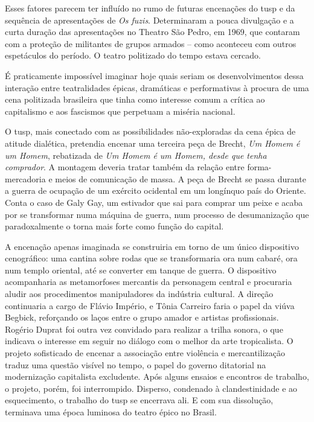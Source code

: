 Esses fatores parecem ter influído no rumo de futuras encenações do {\sc tusp}
e da sequência de apresentações de {\it Os fuzis}. Determinaram a pouca
divulgação e a curta duração das apresentações no Theatro São Pedro, em
1969, que contaram com a proteção de militantes de grupos armados -- como
aconteceu com outros espetáculos do período. O teatro politizado do
tempo estava cercado.

É praticamente impossível imaginar hoje quais seriam os desenvolvimentos
dessa interação entre teatralidades épicas, dramáticas e performativas à
procura de uma cena politizada brasileira que tinha como interesse comum
a crítica ao capitalismo e aos fascismos que perpetuam a miséria
nacional.

O {\sc tusp}, mais conectado com as possibilidades não-exploradas da cena
épica de atitude dialética, pretendia encenar uma terceira peça de
Brecht, {\it Um Homem é um Homem}, rebatizada de {\it Um Homem é um
Homem, desde que tenha comprador}. A montagem deveria tratar também da
relação entre forma-mercadoria e meios de comunicação de massa. A peça
de Brecht se passa durante a guerra de ocupação de um exército ocidental
em um longínquo país do Oriente. Conta o caso de Galy Gay, um estivador
que sai para comprar um peixe e acaba por se transformar numa máquina de
guerra, num processo de desumanização que paradoxalmente o torna mais
forte como função do capital.

A encenação apenas imaginada se construiria em torno de um único
dispositivo cenográfico: uma cantina sobre rodas que se transformaria
ora num cabaré, ora num templo oriental, até se converter em tanque de
guerra. O dispositivo acompanharia as metamorfoses mercantis da
personagem central e procuraria aludir aos procedimentos manipuladores
da indústria cultural. A direção continuaria a cargo de Flávio Império,
e Tônia Carreiro faria o papel da viúva Begbick, reforçando os laços
entre o grupo amador e artistas profissionais. Rogério Duprat foi outra
vez convidado para realizar a trilha sonora, o que indicava o interesse
em seguir no diálogo com o melhor da arte tropicalista. O projeto
sofisticado de encenar a associação entre violência e mercantilização
traduz uma questão visível no tempo, o papel do governo ditatorial na
modernização capitalista excludente. Após alguns ensaios e encontros de
trabalho, o projeto, porém, foi interrompido. Disperso, condenado à
clandestinidade e ao esquecimento, o trabalho do {\sc tusp} se encerrava ali.
E com sua dissolução, terminava uma época luminosa do teatro épico no
Brasil.

